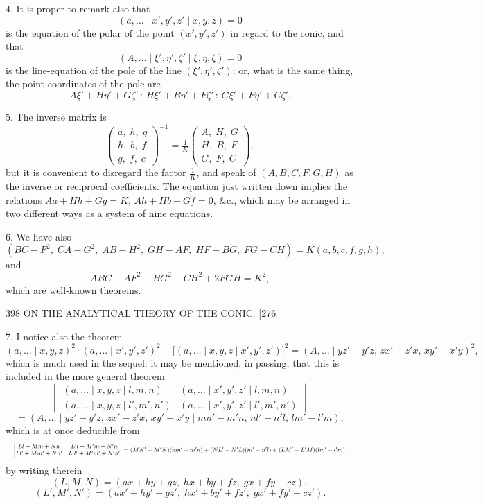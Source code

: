 \documentclass[11pt]{article}
\begin{document}
\textsc{4.} It is proper to remark also that
\[ (a,\dots \mid x',y',z' \mid x,y,z)=0 \]
is the equation of the polar of the point $(x',y',z')$ in regard to the conic, and that
\[ (A,\dots \mid \xi',\eta',\zeta' \mid \xi,\eta,\zeta)=0 \]
is the line-equation of the pole of the line $(\xi',\eta',\zeta')$; or, what is the same thing, the
point-coordinates of the pole are
\[ A\xi'+H\eta'+G\zeta'\,:\,H\xi'+B\eta'+F\zeta'\,:\,G\xi'+F\eta'+C\zeta'. \]

\textsc{5.} The inverse matrix is
\[
\begin{pmatrix} a,\;h,\;g\\ h,\;b,\;f\\ g,\;f,\;c \end{pmatrix}^{-1}
=\tfrac{1}{K}
\begin{pmatrix} A,\;H,\;G\\ H,\;B,\;F\\ G,\;F,\;C \end{pmatrix},
\]
but it is convenient to disregard the factor $\tfrac{1}{K}$, and speak of $(A,B,C,F,G,H)$ as
the inverse or reciprocal coefficients. The equation just written down implies the
relations $Aa+Hh+Gg=K$, $Ah+Hb+Gf=0$, \&c., which may be arranged in two
different ways as a system of nine equations.

\textsc{6.} We have also
\[ (BC-F^{2},\;CA-G^{2},\;AB-H^{2},\;GH-AF,\;HF-BG,\;FG-CH)=K(a,b,c,f,g,h), \]
and
\[ ABC-AF^{2}-BG^{2}-CH^{2}+2FGH=K^{2}, \]
which are well-known theorems.

\begin{center}
398 \hfill ON THE ANALYTICAL THEORY OF THE CONIC. \hfill \textsc{[276}
\end{center}

\textsc{7.} I notice also the theorem
\[ (a,\dots \mid x,y,z)^{2}\cdot(a,\dots \mid x',y',z')^{2}-\bigl[(a,\dots \mid x,y,z \mid x',y',z')\bigr]^{2}
   =(A,\dots \mid yz'-y'z,\,zx'-z'x,\,xy'-x'y)^{2}, \]
which is much used in the sequel: it may be mentioned, in passing, that this is
included in the more general theorem
\[ \begin{vmatrix}
(a,\dots \mid x,y,z \mid l,m,n) & (a,\dots \mid x',y',z' \mid l,m,n)\\
(a,\dots \mid x,y,z \mid l',m',n') & (a,\dots \mid x',y',z' \mid l',m',n')
\end{vmatrix} \]
\[ =(A,\dots \mid yz'-y'z,\,zx'-z'x,\,xy'-x'y \mid mn'-m'n,\,nl'-n'l,\,lm'-l'm), \]
which is at once deducible from
\[ \resizebox{\textwidth}{!}{$\displaystyle
\begin{vmatrix}
Ll+Mm+Nn & L'l+M'm+N'n\\
Ll'+Mm'+Nn' & L'l'+M'm'+N'n'
\end{vmatrix}
=(MN'-M'N)(mn'-m'n)+(NL'-N'L)(nl'-n'l)+(LM'-L'M)(lm'-l'm),
$} \]
by writing therein
\[ (L,M,N)=(ax+hy+gz,\;hx+by+fz,\;gx+fy+cz), \]
\[ (L',M',N')=(ax'+hy'+gz',\;hx'+by'+fz',\;gx'+fy'+cz'). \]
\end{document}
